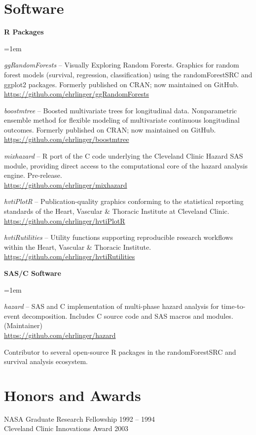 \documentclass[letterpaper,11pt]{nih}
\newenvironment{myList} {
\vspace*{-5pt}
\begin{list}{}{\leftmargin=1em}
  \setlength{\itemsep}{3pt}
  \setlength{\parskip}{0pt}
  \setlength{\parsep}{0pt}}
{\end{list}}
\begin{document}
{\section*{Software}
\textbf{R Packages}
\begin{myList}
\item[] {\em ggRandomForests} -- Visually Exploring Random Forests. Graphics for random forest models (survival, regression, classification) using the randomForestSRC and ggplot2 packages. Formerly published on CRAN; now maintained on GitHub.\\ \url{https://github.com/ehrlinger/ggRandomForests}
\item[] {\em boostmtree} -- Boosted multivariate trees for longitudinal data. Nonparametric ensemble method for flexible modeling of multivariate continuous longitudinal outcomes. Formerly published on CRAN; now maintained on GitHub.\\ \url{https://github.com/ehrlinger/boostmtree}
\item[] {\em mixhazard} -- R port of the C code underlying the Cleveland Clinic Hazard SAS module, providing direct access to the computational core of the hazard analysis engine. Pre-release.\\ \url{https://github.com/ehrlinger/mixhazard}
\item[] {\em hvtiPlotR} -- Publication-quality graphics conforming to the statistical reporting standards of the Heart, Vascular \& Thoracic Institute at Cleveland Clinic.\\ \url{https://github.com/ehrlinger/hvtiPlotR}
\item[] {\em hvtiRutilities} -- Utility functions supporting reproducible research workflows within the Heart, Vascular \& Thoracic Institute.\\ \url{https://github.com/ehrlinger/hvtiRutilities}
\end{myList}
\textbf{SAS/C Software}
\begin{myList}
\item[] {\em hazard} -- SAS and C implementation of multi-phase hazard analysis for time-to-event decomposition. Includes C source code and SAS macros and modules. (Maintainer)\\ \url{https://github.com/ehrlinger/hazard}
\end{myList}
Contributor to several open-source R packages in the randomForestSRC and survival analysis ecosystem.\\

\section*{Honors and Awards}
NASA Graduate Research Fellowship \hfill 1992 -- 1994\\
Cleveland Clinic Innovations Award \hfill 2003\\
\end{document}
